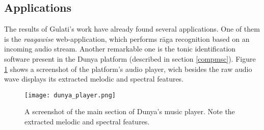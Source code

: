 \subsection{Applications}

The results of Gulati's work have already found several applications. One of them is the {\it raagawise}\cite{raagawise} web-application, which performs r\=aga recognition based on an incoming audio stream. Another remarkable one is the tonic identification software present in the Dunya platform (described in section \ref{compmsc}). Figure \ref{fig:dunya-player} shows a screenshot of the platform's audio player, wich besides the raw audio wave displays its extracted melodic and spectral features.

\begin{figure}[h]
  \centering
  \texttt{[image: dunya\_player.png]}
  \caption{A screenshot of the main section of Dunya's music player. Note the extracted melodic and spectral features.}
  \label{fig:dunya-player}
\end{figure}
